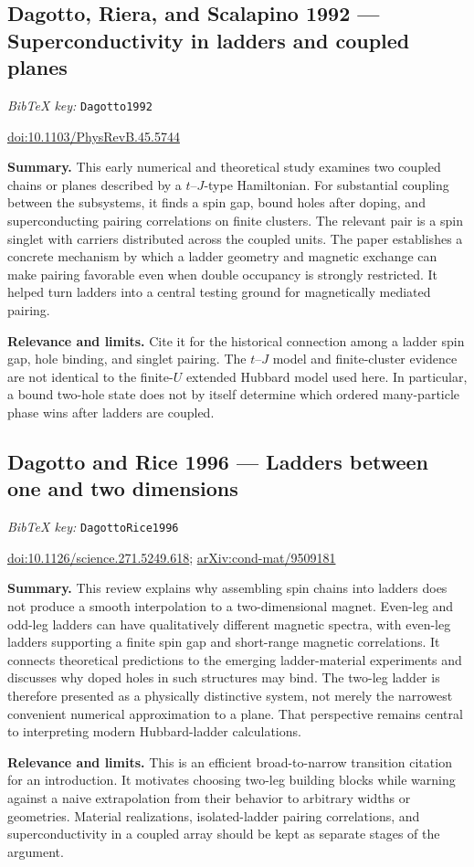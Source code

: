 \documentclass[11pt]{article}
\newcommand{\paper}[2]{\Needspace{8\baselineskip}\subsection{#2}\label{paper:#1}\textit{BibTeX key:} \texttt{#1}\quad\citep{#1}\par}
\newcommand{\doi}[1]{\href{https://doi.org/#1}{doi:#1}}
\newcommand{\arxiv}[1]{\href{https://arxiv.org/abs/#1}{arXiv:#1}}
\newcommand{\summary}{\par\textbf{Summary.} }
\newcommand{\relevance}{\par\textbf{Relevance and limits.} }
\begin{document}
\paper{Dagotto1992}{Dagotto, Riera, and Scalapino 1992 --- Superconductivity in ladders and coupled planes}
\doi{10.1103/PhysRevB.45.5744}
\summary This early numerical and theoretical study examines two coupled chains or planes described by a $t$--$J$-type Hamiltonian. For substantial coupling between the subsystems, it finds a spin gap, bound holes after doping, and superconducting pairing correlations on finite clusters. The relevant pair is a spin singlet with carriers distributed across the coupled units. The paper establishes a concrete mechanism by which a ladder geometry and magnetic exchange can make pairing favorable even when double occupancy is strongly restricted. It helped turn ladders into a central testing ground for magnetically mediated pairing.
\relevance Cite it for the historical connection among a ladder spin gap, hole binding, and singlet pairing. The $t$--$J$ model and finite-cluster evidence are not identical to the finite-$U$ extended Hubbard model used here. In particular, a bound two-hole state does not by itself determine which ordered many-particle phase wins after ladders are coupled.

\paper{DagottoRice1996}{Dagotto and Rice 1996 --- Ladders between one and two dimensions}
\doi{10.1126/science.271.5249.618}; \arxiv{cond-mat/9509181}
\summary This review explains why assembling spin chains into ladders does not produce a smooth interpolation to a two-dimensional magnet. Even-leg and odd-leg ladders can have qualitatively different magnetic spectra, with even-leg ladders supporting a finite spin gap and short-range magnetic correlations. It connects theoretical predictions to the emerging ladder-material experiments and discusses why doped holes in such structures may bind. The two-leg ladder is therefore presented as a physically distinctive system, not merely the narrowest convenient numerical approximation to a plane. That perspective remains central to interpreting modern Hubbard-ladder calculations.
\relevance This is an efficient broad-to-narrow transition citation for an introduction. It motivates choosing two-leg building blocks while warning against a naive extrapolation from their behavior to arbitrary widths or geometries. Material realizations, isolated-ladder pairing correlations, and superconductivity in a coupled array should be kept as separate stages of the argument.
\end{document}
